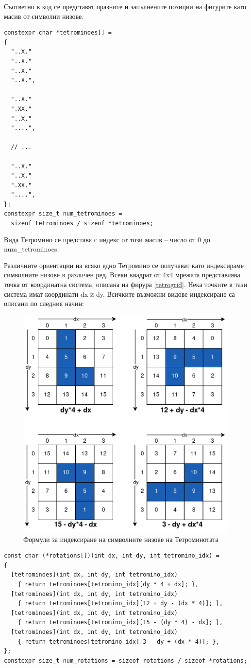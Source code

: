 \documentclass[titlepage, oneside, 14pt]{extbook}
\renewcommand{\texttt}[1]{{\small\ttfamily #1}}
\begin{document}
\newpage

Съответно в код се представят празните и запълнените позиции на фигурите като масив от символни низове.

\begin{verbatim}
constexpr char *tetrominoes[] =
{
  "..X."
  "..X."
  "..X."
  "..X.",

  "..X."
  ".XX."
  "..X."
  "....",

  // ...

  "..X."
  "..X."
  ".XX."
  "....",
};
constexpr size_t num_tetrominoes =
  sizeof tetrominoes / sizeof *tetrominoes;
\end{verbatim}

\begin{sloppypar}Вида Тетромино се представя с индекс от този масив -- число от 0 до \texttt{num_tetrominoes}.\end{sloppypar}

Различните ориентации на всяко едно Тетромино се получават като индексираме символните низове в различен ред.
Всеки квадрат от 4x4 мрежата представлява точка от координатна система, описана на фирура \ref{tetrogrid}.
Нека точките в тази система имат координати \texttt{dx} и \texttt{dy}. Всичките възможни видове индексиране са описани по следния начин:

\begin{figure}[!htbp]
    \centering
    \includegraphics[width=0.6\linewidth]{img/tetromino_rotations.drawio.png}
    \caption{Формули за индексиране на символните низове на Тетроминотата}
\end{figure}

\begin{verbatim}
const char (*rotations[])(int dx, int dy, int tetromino_idx) =
{
  [tetrominoes](int dx, int dy, int tetromino_idx)
    { return tetrominoes[tetromino_idx][dy * 4 + dx]; },
  [tetrominoes](int dx, int dy, int tetromino_idx)
    { return tetrominoes[tetromino_idx][12 + dy - (dx * 4)]; },
  [tetrominoes](int dx, int dy, int tetromino_idx)
    { return tetrominoes[tetromino_idx][15 - (dy * 4) - dx]; },
  [tetrominoes](int dx, int dy, int tetromino_idx)
    { return tetrominoes[tetromino_idx][3 - dy + (dx * 4)]; },
};
constexpr size_t num_rotations = sizeof rotations / sizeof *rotations;
\end{verbatim}
\end{document}
